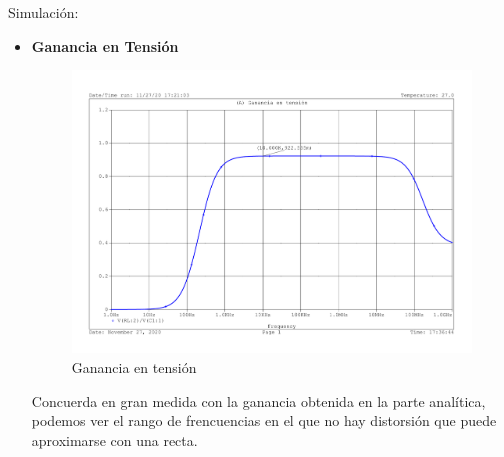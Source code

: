 Simulación:
\begin{itemize}
\item \textbf{Ganancia en Tensión}

  \begin{figure}[H]
    \centering  
    \includegraphics[scale=0.55,page=1,trim]{images/Amplificador_simulation.pdf}
    \caption{Ganancia en tensión}                 
  \end{figure}
 Concuerda en gran medida con la ganancia obtenida en la parte
 analítica, podemos ver el rango de frencuencias en el que no hay
 distorsión que puede aproximarse con una recta.


\end{itemize}
